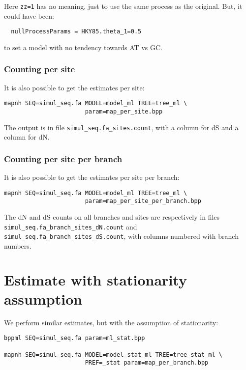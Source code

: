 \documentclass[11pt, a4paper]{article}
\begin{document}
Here \texttt{zz=1} has no meaning, just to use the same process as the
original. But, it could have been:

\begin{verbatim}
  nullProcessParams = HKY85.theta_1=0.5
\end{verbatim}

to set a model with no tendency towards AT vs GC.

\subsubsection*{Counting per site}

It is also possible to get the estimates per site:

\begin{verbatim}
mapnh SEQ=simul_seq.fa MODEL=model_ml TREE=tree_ml \
                       param=map_per_site.bpp
\end{verbatim}


The output is in file \verb|simul_seq.fa_sites.count|, with a column
for dS and a column for dN.

\subsubsection*{Counting per site per branch}

It is also possible to get the estimates per site per branch:

\begin{verbatim}
mapnh SEQ=simul_seq.fa MODEL=model_ml TREE=tree_ml \
                       param=map_per_site_per_branch.bpp
\end{verbatim}

The dN and dS counts on all branches and sites are respectively in
files \verb|simul_seq.fa_branch_sites_dN.count| and\\
\verb|simul_seq.fa_branch_sites_dS.count|, with columns numbered
with branch numbers.


\section*{Estimate with stationarity assumption}

We perform similar estimates, but with the assumption of
stationarity:

\begin{verbatim}
bppml SEQ=simul_seq.fa param=ml_stat.bpp

mapnh SEQ=simul_seq.fa MODEL=model_stat_ml TREE=tree_stat_ml \
                       PREF=_stat param=map_per_branch.bpp

\end{verbatim}
\end{document}
